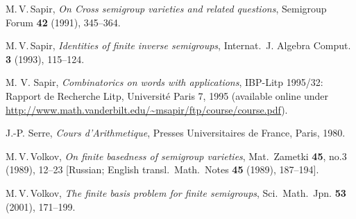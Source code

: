 \documentclass[11pt,reqno]{amsart}
\numberwithin{equation}{section}
\theoremstyle{remark}
\begin{document}
\begin{thebibliography}{99}
M.\,V.\,Sapir, \emph{On Cross semigroup varieties and related
questions}, Semigroup Forum \textbf{ 42} (1991), 345--364.

M.\,V.\,Sapir, \emph{Identities of finite inverse semigroups},
Internat.\ J. Algebra Comput. \textbf{3} (1993), 115--124.

M. V. Sapir, \emph{Combinatorics on words with applications},
IBP-Litp 1995/32: Rapport de Recherche Litp, Universit\'e Paris 7,
1995 (available online under\\
\url{http://www.math.vanderbilt.edu/~msapir/ftp/course/course.pdf}).

J.-P. Serre, \emph{Cours d'Arithmetique}, Presses Universitaires
de France, Paris, 1980.

M.\,V.\,Volkov, \emph{On finite basedness of semigroup varieties},
Mat.\  Zametki \textbf{ 45}, no.3 (1989),  12--23 [Russian;
English transl.\ Math.\ Notes \textbf{ 45} (1989), 187--194].

M.\,V.\,Volkov, \emph{The finite basis problem for finite
semigroups}, Sci.\ Math.\ Jpn. \textbf{53} (2001), 171--199.
\end{thebibliography}
\end{document}
